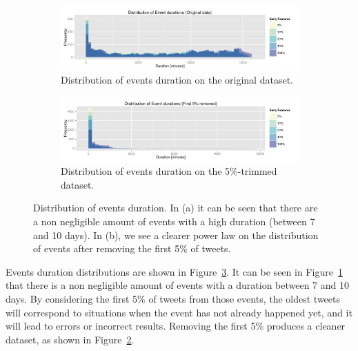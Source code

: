 \begin{figure}[t]
  \centering
  \begin{subfigure}{\textwidth}
    \includegraphics[width=\textwidth]{figures/data/dist-events-durations-o.pdf}
    \caption[Distribution of events duration on the original
      dataset.]{Distribution of events duration on the original dataset.} 
    \label{sfig:dist-events-durations-o}
  \end{subfigure}

  \begin{subfigure}{\textwidth}
    \centering
    \includegraphics[width=\textwidth]{figures/data/dist-events-durations-5.pdf}
    \caption[Distribution of events duration on the 5\%-trimmed
      dataset.]{Distribution of events duration on the 5\%-trimmed dataset.} 
    \label{sfig:dist-events-durations-5}
  \end{subfigure}

  \caption[Distribution of events duration]{Distribution of events duration. In
    (a) it can be seen that there are a non negligible amount of events with a
    high duration (between 7 and 10 days). In (b), we see a clearer power law on
    the distribution of events after removing the first 5\% of tweets.}
  \label{fig:dist-events-durations}
\end{figure}

Events duration distributions are shown in
Figure~\ref{fig:dist-events-durations}. 
%
It can be seen in Figure~\ref{sfig:dist-events-durations-o} that there is a non
negligible amount of events with a duration between 7 and 10 days. 
%
By considering the first 5\% of tweets from those events, the oldest tweets will
correspond to situations when the event has not already happened yet, and it
will lead to errors or incorrect results. 
%
Removing the first 5\% produces a cleaner dataset, as shown in
Figure~\ref{sfig:dist-events-durations-5}.


